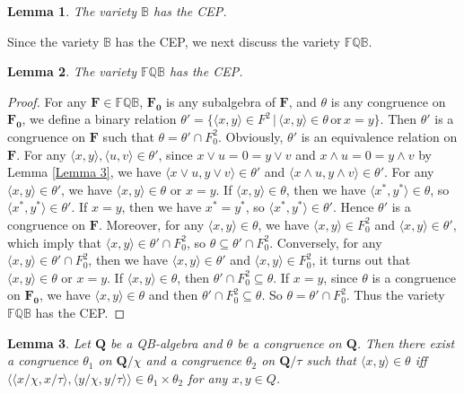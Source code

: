 \documentclass[12pt]{amsart}
\newtheorem{lemma}{Lemma}[section]
\theoremstyle{definition}
\theoremstyle{remark}
\numberwithin{equation}{section}
\begin{document}
\begin{lemma}\label{B CEP}\emph{\cite{Boolean CEP}}
The variety $\mathbb{B}$ has the CEP.
\end{lemma}

Since the variety $\mathbb{B}$ has the CEP, we next discuss the variety $\mathbb{FQB}$.

\begin{lemma}\label{Lemma 5}
The variety $\mathbb{FQB}$ has the CEP.
\end{lemma}

\begin{proof}
For any $\mathbf{F}\in \mathbb{FQB}$, $\mathbf{F_{0}}$ is any subalgebra of $\mathbf{F}$, and $\theta$ is any congruence on $\mathbf{F_{0}}$, we define a binary relation $\theta' =\{\langle x,y \rangle \in F^{2} \,|\, \langle x,y \rangle \in \theta \,\mathrm{or}\,x=y  \}$. Then $\theta'$ is a congruence on $\mathbf{F}$ such that $\theta =\theta' \cap F_{0} ^{2}$. Obviously, $\theta'$ is an equivalence relation on $\mathbf{F}$. For any $\langle x,y \rangle, \langle u,v \rangle \in \theta '$, since $x\vee u=0=y\vee v$ and $x\wedge u=0=y\wedge v$ by Lemma \ref{Lemma 3}, we have $\langle x\vee u, y\vee v\rangle \in \theta'$ and $\langle x\wedge u, y\wedge v\rangle \in \theta'$. For any $\langle x,y\rangle \in \theta'$, we have $\langle x,y\rangle \in \theta$ or $x=y$. If $\langle x, y\rangle \in \theta$, then we have $\langle x^{\ast}, y^{\ast}\rangle \in \theta$, so $\langle x^{\ast}, y^{\ast}\rangle \in \theta'$. If $x=y$, then we have $x^{\ast}=y^{\ast}$, so $\langle x^{\ast}, y^{\ast}\rangle \in \theta'$. Hence $\theta'$ is a congruence on $\mathbf{F}$. Moreover, for any $\langle x,y \rangle \in \theta$, we have $\langle x,y \rangle \in F_{0}^{2}$ and $\langle x,y \rangle \in \theta'$, which imply that $\langle x,y \rangle \in \theta' \cap F_{0}^{2}$, so $\theta \subseteq \theta' \cap F_{0} ^{2}$. Conversely, for any $\langle x,y \rangle \in \theta' \cap F_{0}^{2}$, then we have $\langle x,y \rangle \in \theta'$ and $\langle x,y \rangle \in F_{0}^{2}$, it turns out that $\langle x,y \rangle \in \theta$ or $x=y$. If $\langle x,y \rangle \in \theta$, then $\theta' \cap F_{0}^{2}\subseteq \theta$. If $x=y$, since $\theta$ is a congruence on $\mathbf{F_{0}}$, we have $\langle x,y \rangle \in \theta$ and then $\theta' \cap F_{0}^{2}\subseteq \theta$. So $\theta =\theta' \cap F_{0}^{2}$. Thus the variety $\mathbb{FQB}$ has the CEP.
\end{proof}


\begin{lemma}\label{Lemma 6}
Let $\mathbf{Q}$ be a QB-algebra and $\theta$ be a congruence on $\mathbf{Q}$. Then there exist a congruence $\theta_{1}$ on $\mathbf{Q}/\chi$ and a congruence $\theta_{2}$ on $\mathbf{Q}/\tau$ such that $\langle x,y \rangle \in \theta$ iff $\langle \langle x/\chi ,x/\tau \rangle, \langle y/\chi ,y/\tau \rangle \rangle \in \theta_{1} \times \theta_{2}$ for any $x,y\in Q$.
\end{lemma}
\end{document}

